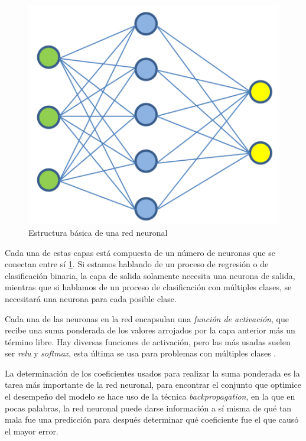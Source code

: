 \documentclass[journal]{IEEEtran}                                                          %
\begin{document}
            \begin{figure}[!htb]
                \centering
                \includegraphics[scale=0.3]{../report/img/nn-diagram.png}
                \caption{Estructura básica de una red neuronal}
                \label{nn-diagram}
            \end{figure}

            Cada una de estas capas está compuesta de un número de neuronas que se conectan entre sí \ref{nn-diagram}. Si estamos hablando de un proceso de regresión o de clasificación binaria, la capa de salida solamente necesita una neurona de salida, mientras que si hablamos de un proceso de clasificación con múltiples clases, se necesitará una neurona para cada posible clase.

            Cada una de las neuronas en la red encapsulan una \emph{función de activación}, que recibe una suma ponderada de los valores arrojados por la capa anterior más un término libre. Hay diversas funciones de activación, pero las más usadas suelen ser \emph{relu} y \emph{softmax}, esta última se usa para problemas con múltiples clases \cite{geron-2019}.

            La determinación de los coeficientes usados para realizar la suma ponderada es la tarea más importante de la red neuronal, para encontrar el conjunto que optimice el desempeño del modelo se hace uso de la técnica \emph{backpropagation}, en la que en pocas palabras, la red neuronal puede darse información a sí misma de qué tan mala fue una predicción para después determinar qué coeficiente fue el que causó el mayor error.
\end{document}

